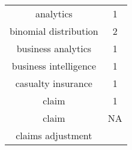\documentclass[]{book}
\begin{document}
\begin{longtable}[]{@{}cc@{}}
\toprule
\begin{minipage}[t]{0.43\columnwidth}\centering\strut
analytics\strut
\end{minipage} & \begin{minipage}[t]{0.05\columnwidth}\centering\strut
1\strut
\end{minipage}\tabularnewline
\begin{minipage}[t]{0.43\columnwidth}\centering\strut
binomial distribution\strut
\end{minipage} & \begin{minipage}[t]{0.05\columnwidth}\centering\strut
2\strut
\end{minipage}\tabularnewline
\begin{minipage}[t]{0.43\columnwidth}\centering\strut
business analytics\strut
\end{minipage} & \begin{minipage}[t]{0.05\columnwidth}\centering\strut
1\strut
\end{minipage}\tabularnewline
\begin{minipage}[t]{0.43\columnwidth}\centering\strut
business intelligence\strut
\end{minipage} & \begin{minipage}[t]{0.05\columnwidth}\centering\strut
1\strut
\end{minipage}\tabularnewline
\begin{minipage}[t]{0.43\columnwidth}\centering\strut
casualty insurance\strut
\end{minipage} & \begin{minipage}[t]{0.05\columnwidth}\centering\strut
1\strut
\end{minipage}\tabularnewline
\begin{minipage}[t]{0.43\columnwidth}\centering\strut
claim\strut
\end{minipage} & \begin{minipage}[t]{0.05\columnwidth}\centering\strut
1\strut
\end{minipage}\tabularnewline
\begin{minipage}[t]{0.43\columnwidth}\centering\strut
claim\strut
\end{minipage} & \begin{minipage}[t]{0.05\columnwidth}\centering\strut
NA\strut
\end{minipage}\tabularnewline
\begin{minipage}[t]{0.43\columnwidth}\centering\strut
claims adjustment\strut

\end{minipage}
\end{longtable}
\end{document}
